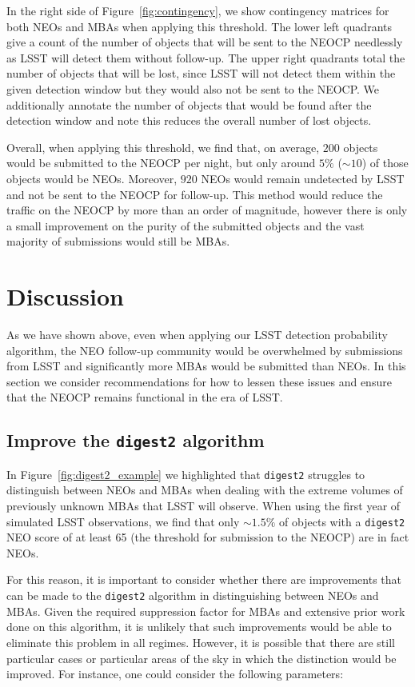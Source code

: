 \documentclass[twocolumn]{aastex631}
\newcommand{\dig}{\texttt{digest2}}
\newcommand{\npernightAlg}{200}
\newcommand{\purityAlg}{5}
\newcommand{\purityAlgRaw}{10}
\newcommand{\neoLostAlg}{920}
\begin{document}
In the right side of Figure~\ref{fig:contingency}, we show contingency matrices for both NEOs and MBAs when applying this threshold. The lower left quadrants give a count of the number of objects that will be sent to the NEOCP needlessly as LSST will detect them without follow-up. The upper right quadrants total the number of objects that will be lost, since LSST will not detect them within the given detection window but they would also not be sent to the NEOCP. We additionally annotate the number of objects that would be found after the detection window and note this reduces the overall number of lost objects.

Overall, when applying this threshold, we find that, on average, $\npernightAlg{}$ objects would be submitted to the NEOCP per night, but only around $\purityAlg{}\%$ (${\sim}\purityAlgRaw{}$) of those objects would be NEOs. Moreover, $\neoLostAlg{}$ NEOs would remain undetected by LSST and not be sent to the NEOCP for follow-up. This method would reduce the traffic on the NEOCP by more than an order of magnitude, however there is only a small improvement on the purity of the submitted objects and the vast majority of submissions would still be MBAs. 

\section{Discussion} \label{sec:discussion}
As we have shown above, even when applying our LSST detection probability algorithm, the NEO follow-up community would be overwhelmed by submissions from LSST and significantly more MBAs would be submitted than NEOs. In this section we consider recommendations for how to lessen these issues and ensure that the NEOCP remains functional in the era of LSST.

\subsection{Improve the \dig{} algorithm}
In Figure~\ref{fig:digest2_example} we highlighted that \dig{} struggles to distinguish between NEOs and MBAs when dealing with the extreme volumes of previously unknown MBAs that LSST will observe. When using the first year of simulated LSST observations, we find that only ${\sim}1.5\%$ of objects with a \dig{} NEO score of at least 65 (the threshold for submission to the NEOCP) are in fact NEOs.

For this reason, it is important to consider whether there are improvements that can be made to the \dig{} algorithm in distinguishing between NEOs and MBAs. Given the required suppression factor for MBAs and extensive prior work done on this algorithm, it is unlikely that such improvements would be able to eliminate this problem in all regimes. However, it is possible that there are still particular cases or particular areas of the sky in which the distinction would be improved. For instance, one could consider the following parameters:
\end{document}
